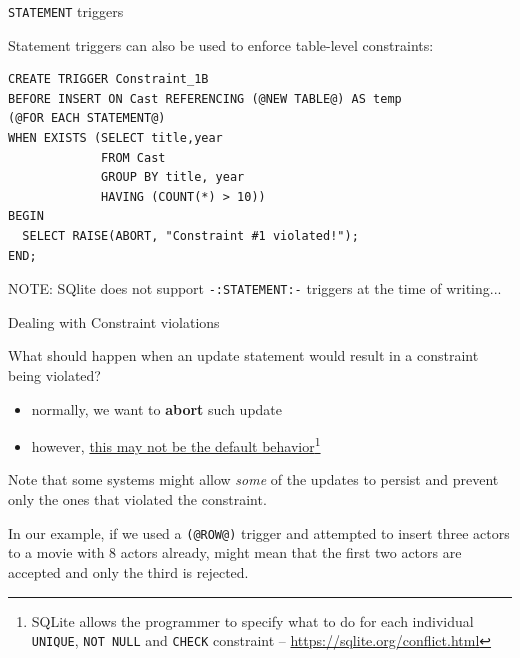 \documentclass[xcolor={usenames,dvipsnames}]{beamer}
\begin{document}
\begin{frame}[fragile]{\lstinline[style=SQL]{STATEMENT} triggers}

Statement triggers can also be used to enforce table-level constraints:

\begin{lstlisting}[style=SQL]
CREATE TRIGGER Constraint_1B
BEFORE INSERT ON Cast REFERENCING (@NEW TABLE@) AS temp
(@FOR EACH STATEMENT@)
WHEN EXISTS (SELECT title,year 
             FROM Cast
             GROUP BY title, year
             HAVING (COUNT(*) > 10))
BEGIN
  SELECT RAISE(ABORT, "Constraint #1 violated!");
END;
\end{lstlisting}

\begin{block}{}
\alert{NOTE:} SQlite does not support \lstinline[style=SQL]{-:STATEMENT:-} triggers at the time of writing...
\end{block}
\end{frame}

%
%

\begin{frame}{Dealing with Constraint violations}

What should happen when an update statement would result in a constraint being \alert{violated}?

\begin{itemize}[-,noitemsep]
\item normally, we want to \textbf{abort} such update\\
 \item however, \underline{this may not be the default behavior}\footnote{SQLite allows the programmer to specify what to do for each individual \texttt{UNIQUE}, \texttt{NOT NULL} and \texttt{CHECK} constraint -- 
\url{https://sqlite.org/conflict.html}}
\end{itemize}

Note that some systems might allow \emph{some} of the updates to persist and prevent only the ones that violated the constraint. 

In our example, if we used a \lstinline[style=SQL]!(@ROW@)! trigger and attempted to insert three actors to a movie with 8 actors already, might mean that the first two actors are accepted and only the third is rejected.

\end{frame} 
\end{document}
